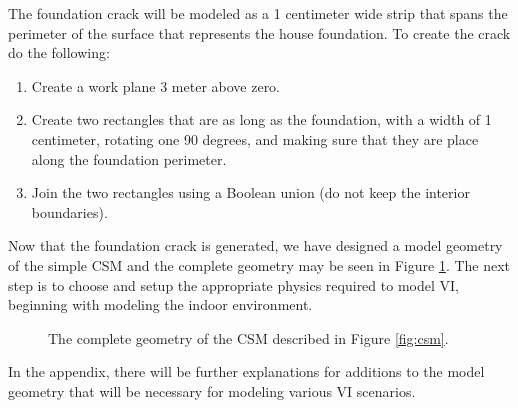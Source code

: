 The foundation crack will be modeled as a 1 centimeter wide strip that spans the perimeter of the surface that represents the house foundation.
To create the crack do the following:
\begin{enumerate}
  \item Create a work plane 3 meter above zero.
  \item Create two rectangles that are as long as the foundation, with a width of 1 centimeter, rotating one 90 degrees, and making sure that they are place along the foundation perimeter.
  \item Join the two rectangles using a Boolean union (do not keep the interior boundaries).
\end{enumerate}
Now that the foundation crack is generated, we have designed a model geometry of the simple CSM and the complete geometry may be seen in Figure \ref{fig:geometry}.
The next step is to choose and setup the appropriate physics required to model VI, beginning with modeling the indoor environment.\par

\begin{figure}[htb!]
  \caption{The complete geometry of the CSM described in Figure \ref{fig:csm}.}
  \label{fig:geometry}
\end{figure}

In the appendix, there will be further explanations for additions to the model geometry that will be necessary for modeling various VI scenarios.\par
